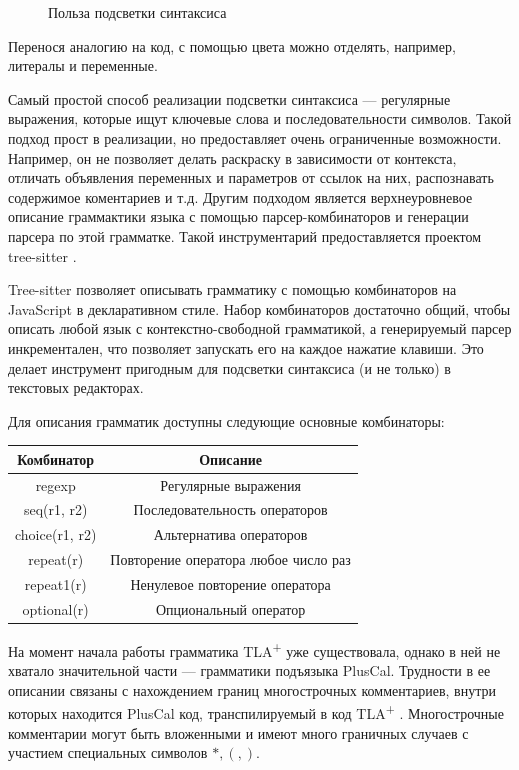 \documentclass[14pt, openany]{report}
\newcommand{\tlapl}{TLA\textsuperscript{+} }
\begin{document}
\begin{figure}[h]
\begin{subfigure}{\linewidth}
  \end{subfigure}
  \label{fig:highlighting}
  \caption{Польза подсветки синтаксиса}
\end{figure}

Перенося аналогию на код, с помощью цвета можно отделять, например, литералы и переменные.

Самый простой способ реализации подсветки синтаксиса --- регулярные выражения, которые ищут ключевые слова и последовательности символов. Такой подход прост в реализации, но предоставляет очень ограниченные возможности. Например, он не позволяет делать раскраску в зависимости от контекста, отличать объявления переменных и параметров от ссылок на них, распознавать содержимое коментариев и т.д. Другим подходом является верхнеуровневое описание граммактики языка с помощью парсер-комбинаторов и генерации парсера по этой грамматке. Такой инструментарий предоставляется проектом tree-sitter \cite{treeSitter}. 

Tree-sitter позволяет описывать грамматику с помощью комбинаторов на JavaScript в декларативном стиле. Набор комбинаторов достаточно общий, чтобы описать любой язык с контекстно-свободной грамматикой, а генерируемый парсер инкрементален, что позволяет запускать его на каждое нажатие клавиши. Это делает инструмент пригодным для подсветки синтаксиса (и не только) в текстовых редакторах.

Для описания грамматик доступны следующие основные комбинаторы:
\begin{center}
\begin{tabular}{||c | c||} 
 \hline
Комбинатор & Описание \\ 
 \hline\hline
regexp & Регулярные выражения \\
 \hline
seq(r1, r2) & Последовательность операторов\\ 
 \hline
choice(r1, r2) & Альтернатива операторов \\
 \hline
repeat(r) & Повторение оператора любое число раз\\
 \hline
repeat1(r) & Ненулевое повторение оператора \\
 \hline
optional(r) & Опциональный оператор\\ 
 \hline
\end{tabular}
\end{center}


На момент начала работы грамматика \tlapl уже существовала, однако в ней не хватало значительной части --- грамматики подъязыка PlusCal. Трудности в ее описании связаны с нахождением границ многострочных комментариев, внутри которых находится PlusCal код, транспилируемый в код \tlapl. Многострочные комментарии могут быть вложенными и имеют много граничных случаев с участием специальных символов \(*, (, )\). 
\end{document}
